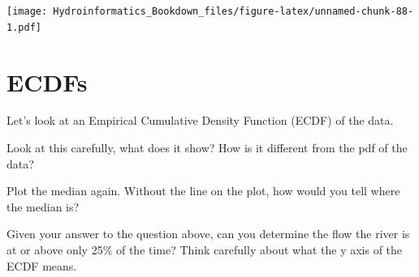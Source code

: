 \documentclass[
]{book}
\newenvironment{Shaded}{\begin{snugshade}}{\end{snugshade}}
\newcommand{\AttributeTok}[1]{\textcolor[rgb]{0.77,0.63,0.00}{#1}}
\newcommand{\DecValTok}[1]{\textcolor[rgb]{0.00,0.00,0.81}{#1}}
\newcommand{\FunctionTok}[1]{\textcolor[rgb]{0.00,0.00,0.00}{#1}}
\newcommand{\NormalTok}[1]{#1}
\newcommand{\SpecialCharTok}[1]{\textcolor[rgb]{0.00,0.00,0.00}{#1}}
\newcommand{\StringTok}[1]{\textcolor[rgb]{0.31,0.60,0.02}{#1}}
\begin{document}
\begin{Shaded}
\end{Shaded}

\texttt{[image: Hydroinformatics\_Bookdown\_files/figure-latex/unnamed-chunk-88-1.pdf]}

\hypertarget{ecdfs}{%
\section{ECDFs}\label{ecdfs}}

Let's look at an Empirical Cumulative Density Function (ECDF) of the data.

Look at this carefully, what does it show? How is it different from the pdf of the data?

Plot the median again. Without the line on the plot, how would you tell where the median is?

Given your answer to the question above, can you determine the flow the river is at or above only 25\% of the time? Think carefully about what the y axis of the ECDF means.

\begin{Shaded}
\end{Shaded}
\end{document}
